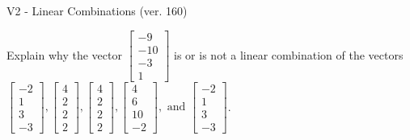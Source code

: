 \begin{exercise}
  \begin{exerciseTitle}V2 - Linear Combinations (ver. 160)\end{exerciseTitle}
  \begin{exerciseStatement}
    Explain why the vector \(\left[\begin{array}{c}
-9 \\
-10 \\
-3 \\
1
\end{array}\right]\)  is or is not a linear 
	combination of the vectors \(\left[\begin{array}{c}
-2 \\
1 \\
3 \\
-3
\end{array}\right] , \left[\begin{array}{c}
4 \\
2 \\
2 \\
2
\end{array}\right] , \left[\begin{array}{c}
4 \\
2 \\
2 \\
2
\end{array}\right] , \left[\begin{array}{c}
4 \\
6 \\
10 \\
-2
\end{array}\right] , \text{ and } \left[\begin{array}{c}
-2 \\
1 \\
3 \\
-3
\end{array}\right]\).
	



\end{exerciseStatement}
\end{exercise}
